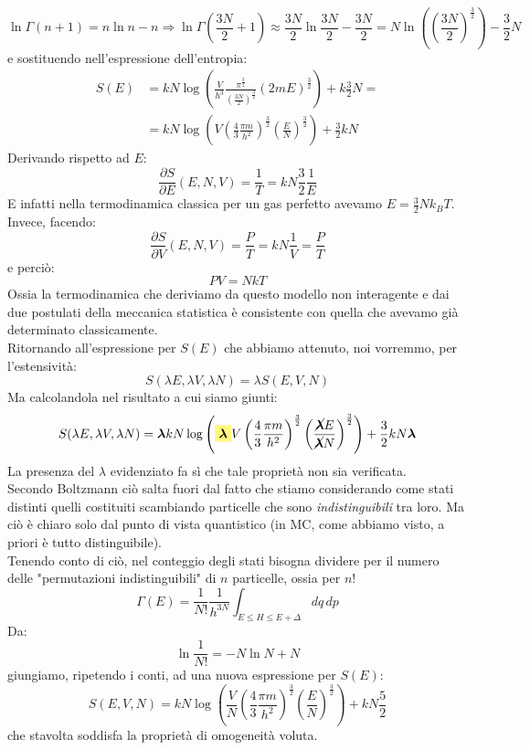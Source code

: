 \documentclass[12pt]{article}
\begin{document}
\[
\ln\Gamma(n+1)=n\ln n-n \Rightarrow \ln\Gamma\left(\frac{3N}{2}+1\right)\approx \frac{3N}{2}\ln \frac{3N}{2}-\frac{3N}{2} = N\ln\left(\left(\frac{3N}{2}\right)^{\frac{3}{2}}\right)-\frac{3}{2}N
\]
e sostituendo nell'espressione dell'entropia:
\begin{align*}
S(E)&=kN\log\left(
\frac{V}{h^3}\frac{\pi^{\frac{3}{2}}}{\left(\frac{3N}{2}\right)^{\frac{3}{2}}}
(2mE)^{\frac{3}{2}}
\right)+k\frac{3}{2}N =\\
&= kN\log\left(V\left(\frac{4}{3}\frac{\pi m}{h^2}\right)^{\frac{3}{2}}\left(\frac{E}{N}\right)^{\frac{3}{2}}\right)+\frac{3}{2}kN
\end{align*}
Derivando rispetto ad $E$:
\[
\frac{\partial S}{\partial E}(E,N,V) = \frac{1}{T} = kN\frac{3}{2}\frac{1}{E}
\]
E infatti nella termodinamica classica per un gas perfetto avevamo $E=\frac{3}{2}Nk_B T$.\\
Invece, facendo:
\[
\frac{\partial S}{\partial V}(E,N,V) =\frac{P}{T} = kN\frac{1}{V}=\frac{P}{T}
\]
e perciò:
\[
PV=NkT
\]
Ossia la termodinamica che deriviamo da questo modello non interagente e dai due postulati della meccanica statistica è consistente con quella che avevamo già determinato classicamente.\\
Ritornando all'espressione per $S(E)$ che abbiamo attenuto, noi vorremmo, per l'estensività:
\[
S(\lambda E, \lambda V, \lambda N)=\lambda S(E,V,N)
\]
Ma calcolandola nel risultato a cui siamo giunti:
\[
S(\lambda E, \lambda V, \lambda N)= \bm{\lambda}kN\log\left(\hlc{Yellow}{\bm{\lambda}}V\left(\frac{4}{3}\frac{\pi m}{h^2}\right)^{\frac{3}{2}}\left(\frac{\cancel{\bm{\lambda}} E}{\cancel{\bm{\lambda}}N}\right)^{\frac{3}{2}}\right)+\frac{3}{2}kN\bm{\lambda}
\]
La presenza del $\lambda$ evidenziato fa sì che tale proprietà non sia verificata.\\
Secondo Boltzmann ciò salta fuori dal fatto che stiamo considerando come stati distinti quelli costituiti scambiando particelle che sono \textit{indistinguibili} tra loro. Ma ciò è chiaro solo dal punto di vista quantistico (in MC, come abbiamo visto, a priori è tutto distinguibile).\\
Tenendo conto di ciò, nel conteggio degli stati bisogna dividere per il numero delle "permutazioni indistinguibili" di $n$ particelle, ossia per $n!$
\[
\Gamma(E)=\frac{1}{N!}\frac{1}{h^{3N}}\int_{E\leq H \leq E+\Delta}dq\,dp
\]
Da:
\[
\ln \frac{1}{N!} = -N\ln N+N
\]
giungiamo, ripetendo i conti, ad una nuova espressione per $S(E)$:
\[
S(E,V,N)=kN\log\left(\frac{V}{N}\left(\frac{4}{3}\frac{\pi m}{h^2}\right)^{\frac{3}{2}}\left(\frac{E}{N}\right)^{\frac{3}{2}}\right ) + kN\frac{5}{2}
\]
che stavolta soddisfa la proprietà di omogeneità voluta.
\end{document}
